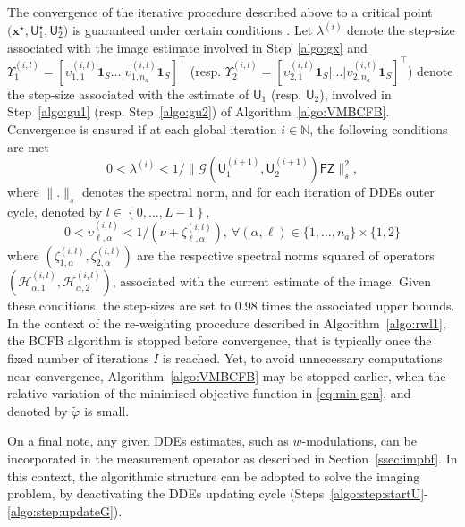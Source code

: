 \documentclass[fleqn,usenatbib]{mnras}
\newcommand{\xb}{\ensuremath{\boldsymbol{x}}}
\newcommand{\Fb}{\ensuremath{\boldsymbol{\mathsf{F}}}}
\newcommand{\Ub}{\ensuremath{\boldsymbol{\mathsf{U}}}}
\newcommand{\Zb}{\ensuremath{\boldsymbol{\mathsf{Z}}}}
\newcommand{\unb}{\ensuremath{\boldsymbol{1}}}
\newcommand{\Gc}{\ensuremath{\mathcal{G}}}
\newcommand{\Hc}{\ensuremath{\mathcal{H}}}
\newcommand{\eN}{\mathbb{N}}
\begin{document}
The convergence of the iterative procedure described above to a critical point $\big( \xb^\star, \Ub_{1}^\star,\Ub_{2}^\star\big)$ is guaranteed under certain conditions {{\citep{Chouzenoux2016,Repetti2017}}}. Let $\lambda^{(i)}$ denote the {step-size} associated with the image estimate involved in Step~\ref{algo:gx} and $\Upsilon_1^{(i,l)} = \left[ \upsilon_{1,1}^{(i,l)} \unb_S \ldots | \upsilon_{1,n_a}^{(i,l)} \unb_S\right]^\top $ (resp. $
\Upsilon_2^{(i,l)} = \left[ \upsilon_{2,1}^{(i,l)} \unb_S |	\ldots | \upsilon_{2,n_a}^{(i,l)} \unb_S\right]^\top $) denote the {step-size} associated with the estimate of $\Ub_1$ (resp. $\Ub_2$), involved in Step~\ref{algo:gu1} (resp. Step~\ref{algo:gu2}) of Algorithm~\ref{algo:VMBCFB}. {{Convergence is ensured}} if at each global iteration $i\in \eN$, the following conditions are met
\begin{equation}
0 < \lambda^{(i)} < 1/ \| \Gc\left( \Ub^{(i+1)}_1,\Ub^{(i+1)}_2\right) {\Fb\Zb} \|_s^2,
\end{equation}
where $\|.\|_s$ denotes the spectral norm, and for each iteration of DDEs outer cycle, denoted by $l \in \left \lbrace 0,\dots,L-1 \right \rbrace$, 
\begin{equation}
0 < \upsilon_{\ell,\alpha}^{(i,l)} < 1 / ( \nu + \zeta_{\ell,\alpha}^{(i,l)} ), ~\forall (\alpha,\ell) \in \{1, \ldots, n_a\}\times \{1,2\}
\end{equation}
where $\left(\zeta_{1,\alpha}^{(i,l)},\zeta_{2,\alpha}^{(i,l)}\right) $ are the respective spectral norms {{squared}} of operators $\left(\Hc_{\alpha,1}^{(i,l)},\Hc_{\alpha,2}^{(i,l)}\right) $, {associated with the current estimate of the image}. {{Given these conditions, the step-sizes are set to 0.98 times the associated upper bounds.}}
In the context of the re-weighting procedure described in Algorithm~\ref{algo:rwl1}, the BCFB algorithm is stopped before convergence, that is typically once the fixed number of iterations $I$ is reached. {{Yet, to avoid unnecessary computations near convergence,  Algorithm~\ref{algo:VMBCFB} may be stopped earlier, when the relative variation of the minimised objective function in \eqref{eq:min-gen}, and denoted by $\tilde{\varphi}$ is small.}} 


{{On a final note, any given DDEs estimates, such as $w$-modulations,  can be incorporated in the measurement operator as described in Section~\ref{ssec:impbf}. In this context, the algorithmic structure can be adopted to solve the imaging problem, by deactivating the DDEs updating cycle (Steps~\ref{algo:step:startU}-\ref{algo:step:updateG}).}}
{{
}}
\end{document}
